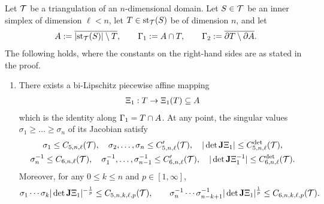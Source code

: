 \documentclass[10pt,a4paper]{article}
\begin{document}
        
        
        
        



\color{magenta}
\begin{proposition}\label{proposition:starreflection}
    Let ${\mathcal T}$ be a triangulation of an $n$-dimensional domain. 
    Let $S \in {\mathcal T}$ be an inner simplex of dimension $\ell < n$,
    let $T \in \operatorname{st}_{{\mathcal T}}(S)$ be of dimension $n$,
    and let 
    \begin{align*}
        A := \overline{ \left| \operatorname{st}_{{\mathcal T}}(S) \right| \setminus T },
        \qquad 
        {\Gamma_1} := A \cap T,
        \qquad 
        {\Gamma_2} := \overline{ \partial T \setminus \partial A }.
    \end{align*}
    The following holds, where the constants on the right-hand sides are as stated in the proof. 
    \begin{enumerate}
    \item 
    There exists a bi-Lipschitz piecewise affine mapping
    \begin{align*}
        \Xi_{1} : T \rightarrow \Xi_{1}(T) \subseteq A 
    \end{align*}
    which is the identity along ${\Gamma_1} = T \cap A$. 
    At any point, the singular values $\sigma_1 \geq \dots \geq \sigma_n$ of its Jacobian satisfy 
    \begin{gather*}
        \sigma_1 \leq C_{5,n,\ell}({\mathcal T}),
        \quad 
        \sigma_2,\dots,\sigma_n \leq C'_{5,n,\ell}({\mathcal T}),
        \quad 
        | \det{\mathbf{J}}\Xi_{1} |      \leq C^{\det}_{5,n,\ell}({\mathcal T}),
        \\
        \sigma_n^{-1} \leq C_{6,n,\ell}({\mathcal T}),
        \quad 
        \sigma_1^{-1},\dots,\sigma_{n-1}^{-1} \leq C'_{6,n,\ell}({\mathcal T}),
        \quad 
        | \det{\mathbf{J}}\Xi_{1}^{-1} | \leq C^{\det}_{6,n,\ell}({\mathcal T}).
    \end{gather*}
    Moreover, for any $0 \leq k \leq n$ and $p \in [1,\infty]$,
    \begin{align*}
        \sigma_{1}\cdots\sigma_{k} | \det{\mathbf{J}}\Xi_{1} |^{-\frac 1 p}
        \leq 
        C_{5,n,k,\ell,p}({\mathcal T}),
        \qquad 
        \sigma_{n}^{-1}\cdots\sigma_{n-k+1}^{-1} | \det{\mathbf{J}}\Xi_{1} |^{\frac 1 p}
        \leq 
        C_{6,n,k,\ell,p}({\mathcal T}).
    \end{align*}


\end{enumerate}
\end{proposition}
\end{document}
